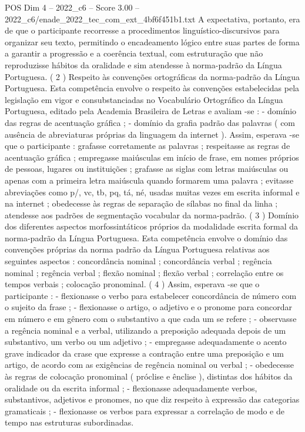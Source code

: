 \begin{textsample}{POS Dim 4 – 2022\_c6 – Score 3.00 – 2022\_c6/enade\_2022\_tec\_com\_ext\_4bf6f451b1.txt}
A expectativa, portanto, era de que o participante recorresse a procedimentos linguístico-discursivos para organizar seu texto, permitindo o encadeamento lógico entre suas partes de forma a garantir a progressão e a coerência textual, com estruturação que não reproduzisse hábitos da oralidade e sim atendesse à norma-padrão da Língua Portuguesa. ( 2 ) Respeito às convenções ortográficas da norma-padrão da Língua Portuguesa.
Esta competência envolve o respeito às convenções estabelecidas pela legislação em vigor e consubstanciadas no Vocabulário Ortográfico da Língua Portuguesa, editado pela Academia Brasileira de Letras e avaliam -se : - domínio das regras de acentuação gráfica ; - domínio da grafia padrão das palavras ( com ausência de abreviaturas próprias da linguagem da internet ).
Assim, esperava -se que o participante : grafasse corretamente as palavras ; respeitasse as regras de acentuação gráfica ; empregasse maiúsculas em início de frase, em nomes próprios de pessoas, lugares ou instituições ; grafasse as siglas com letras maiúsculas ou apenas com a primeira letra maiúscula quando formarem uma palavra ; evitasse abreviações como p/, vc, tb, pq, tá, né, usadas muitas vezes em escrita informal e na internet ; obedecesse às regras de separação de sílabas no final da linha ; atendesse aos padrões de segmentação vocabular da norma-padrão. ( 3 ) Domínio dos diferentes aspectos morfossintáticos próprios da modalidade escrita formal da norma-padrão da Língua Portuguesa.
Esta competência envolve o domínio das convenções próprias da norma padrão da Língua Portuguesa relativas aos seguintes aspectos : concordância nominal ; concordância verbal ; regência nominal ; regência verbal ; flexão nominal ; flexão verbal ; correlação entre os tempos verbais ; colocação pronominal. ( 4 ) Assim, esperava -se que o participante : - flexionasse o verbo para estabelecer concordância de número com o sujeito da frase ; - flexionasse o artigo, o adjetivo e o pronome para concordar em número e em gênero com o substantivo a que cada um se refere ; - observasse a regência nominal e a verbal, utilizando a preposição adequada depois de um substantivo, um verbo ou um adjetivo ; - empregasse adequadamente o acento grave indicador da crase que expresse a contração entre uma preposição e um artigo, de acordo com as exigências de regência nominal ou verbal ; - obedecesse às regras de colocação pronominal ( próclise e ênclise ), distintas dos hábitos da oralidade ou da escrita informal ; - flexionasse adequadamente verbos, substantivos, adjetivos e pronomes, no que diz respeito à expressão das categorias gramaticais ; - flexionasse os verbos para expressar a correlação de modo e de tempo nas estruturas subordinadas.

\end{textsample}

